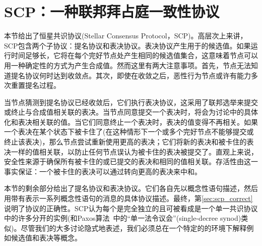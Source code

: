 \section{SCP：一种联邦拜占庭一致性协议}\label{sec:scp}

本节给出了恒星共识协议(Stellar Consensus Protocol，SCP)。高层次上来讲，SCP包含两个子协议：提名协议和表决协议。表决协议产生用于{\slot}的候选值。如果运行时间足够长，它将在每个完好节点处产生相同的候选值集合，这意味着节点可以用一种确定性的方式为{\slot}产生合成值。然而这里有两大注意事项。首先，节点无法知道提名协议何时达到收敛点。其次，即使在收敛之后，恶性行为节点或许有能力多次重置提名过程。

当节点猜测到提名协议已经收敛后，它们执行表决协议，这采用了联邦选举来提交或终止与合成值相关联的表决。当节点同意提交一个表决时，将会为讨论中的{\slot}具体化和表决相关联的值。当它们同意终止一个表决时，表决的值变得不再相关。如果一个表决在某个状态下被卡住了(在这种情形下一个或多个完好节点不能够提交或终止该表决)，那么节点尝试重新使用更高的表决；它们将新的表决和被卡住的表决一样的值相关联，以防止任何节点误认为被卡住的表决被提交了。直观上来说，安全性来源于确保所有被卡住的或已提交的表决和相同的值相关联。存活性由这一事实保证：一个被卡住的表决可以通过转向更高的表决来中和。

本节的剩余部分给出了提名协议和表决协议。它们各自先以概念性语句描述，然后用带有表示一系列概念性语句的消息的具体协议描述。最终，第\ref{sec:scp_correct}说明了协议的正确性。SCP认为每个{\slot}是完全独立的且可被看成是一个单一{\slot}共识协议中的许多分开的实例(和Paxos算法~\cite{Lamport:1998:PP:279227.279229}中的``单一法令议会''(single-decree synod)类似)。尽管我们的大多讨论隐式地表述{\slot}，我们必须总在一个特定的{\slot}的环境下解释例如候选值和表决等概念。



